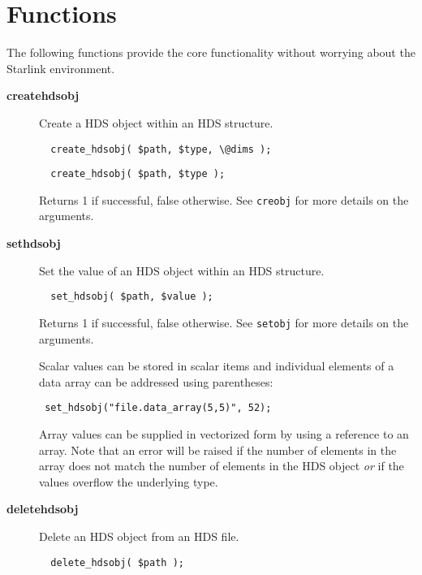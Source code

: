 \documentclass[twoside,11pt]{article}
\renewcommand{\_}{\texttt{\symbol{95}}}
\begin{document}
\section{Functions}

The following functions provide the core functionality without worrying
about the Starlink environment.

\begin{description}

\item[\textbf{create\_hdsobj}] \mbox{}

Create a HDS object within an HDS structure.

\begin{verbatim}
  create_hdsobj( $path, $type, \@dims );
\end{verbatim}
\begin{verbatim}
  create_hdsobj( $path, $type );
\end{verbatim}


Returns 1 if successful, false otherwise. See \texttt{creobj}
for more details on the arguments.


\item[\textbf{set\_hdsobj}] \mbox{}

Set the value of an HDS object within an HDS structure.

\begin{verbatim}
  set_hdsobj( $path, $value );
\end{verbatim}


Returns 1 if successful, false otherwise. See \texttt{setobj}
for more details on the arguments.



Scalar values can be stored in scalar items and individual
elements of a data array can be addressed using parentheses:

\begin{verbatim}
 set_hdsobj("file.data_array(5,5)", 52);
\end{verbatim}


Array values can be supplied in vectorized form by using a reference
to an array. Note that an error will be raised if the number of
elements in the array does not match the number of elements in the HDS
object \textit{or} if the values overflow the underlying type.


\item[\textbf{delete\_hdsobj}] \mbox{}

Delete an HDS object from an HDS file.

\begin{verbatim}
  delete_hdsobj( $path );
\end{verbatim}



\end{description}
\end{document}
